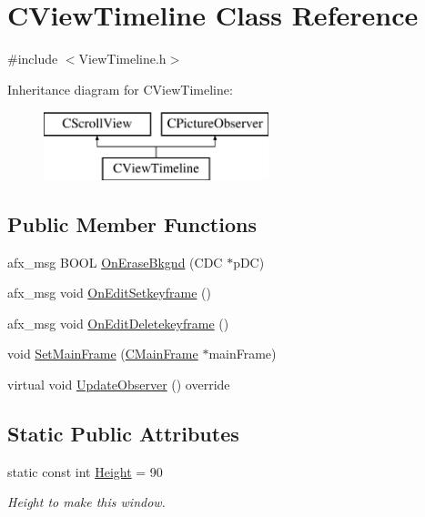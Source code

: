 \hypertarget{class_c_view_timeline}{}\section{C\+View\+Timeline Class Reference}
\label{class_c_view_timeline}


{\ttfamily \#include $<$View\+Timeline.\+h$>$}

Inheritance diagram for C\+View\+Timeline\+:\begin{figure}[H]
\begin{center}
\leavevmode
\includegraphics[height=2.000000cm]{class_c_view_timeline}
\end{center}
\end{figure}
\subsection*{Public Member Functions}
\begin{DoxyCompactItemize}
\item 
afx\+\_\+msg B\+O\+O\+L \hyperlink{class_c_view_timeline_a8328ae76e5f95d36b3ab7e8bbd8ef72f}{On\+Erase\+Bkgnd} (C\+D\+C $\ast$p\+D\+C)
\item 
afx\+\_\+msg void \hyperlink{class_c_view_timeline_acb22f2662a21152e607d17dbc293351c}{On\+Edit\+Setkeyframe} ()
\item 
afx\+\_\+msg void \hyperlink{class_c_view_timeline_ab3eccb4a5bcd5ffa60442359b86e0597}{On\+Edit\+Deletekeyframe} ()
\item 
void \hyperlink{class_c_view_timeline_aba069993dd75712f340999345e791327}{Set\+Main\+Frame} (\hyperlink{class_c_main_frame}{C\+Main\+Frame} $\ast$main\+Frame)
\item 
virtual void \hyperlink{class_c_view_timeline_a21388abd4726fd3dbe02b6e2ea313369}{Update\+Observer} () override
\end{DoxyCompactItemize}
\subsection*{Static Public Attributes}
\begin{DoxyCompactItemize}
\item 
\hypertarget{class_c_view_timeline_a6634479092090825e8c392902cf6c685}{}static const int \hyperlink{class_c_view_timeline_a6634479092090825e8c392902cf6c685}{Height} = 90\label{class_c_view_timeline_a6634479092090825e8c392902cf6c685}

\begin{DoxyCompactList}\small\item\em Height to make this window. \end{DoxyCompactList}\end{DoxyCompactItemize}
